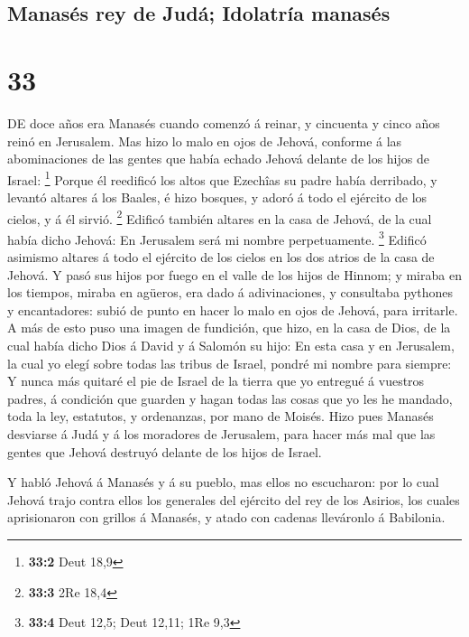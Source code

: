 \hypertarget{manasuxe9s-rey-de-juduxe1-idolatruxeda-manasuxe9s}{%
\subsection{Manasés rey de Judá; Idolatría
manasés}\label{manasuxe9s-rey-de-juduxe1-idolatruxeda-manasuxe9s}}

\hypertarget{section-32}{%
\section{33}\label{section-32}}

 DE doce años era Manasés cuando comenzó á reinar, y
cincuenta y cinco años reinó en Jerusalem.  Mas hizo lo
malo en ojos de Jehová, conforme á las abominaciones de las gentes que
había echado Jehová delante de los hijos de Israel: \footnote{\textbf{33:2}
  Deut 18,9}  Porque él reedificó los altos que Ezechîas
su padre había derribado, y levantó altares á los Baales, é hizo
bosques, y adoró á todo el ejército de los cielos, y á él sirvió.
\footnote{\textbf{33:3} 2Re 18,4}  Edificó también altares
en la casa de Jehová, de la cual había dicho Jehová: En Jerusalem será
mi nombre perpetuamente. \footnote{\textbf{33:4} Deut 12,5; Deut 12,11;
  1Re 9,3}  Edificó asimismo altares á todo el ejército de
los cielos en los dos atrios de la casa de Jehová.  Y pasó
sus hijos por fuego en el valle de los hijos de Hinnom; y miraba en los
tiempos, miraba en agüeros, era dado á adivinaciones, y consultaba
pythones y encantadores: subió de punto en hacer lo malo en ojos de
Jehová, para irritarle.  A más de esto puso una imagen de
fundición, que hizo, en la casa de Dios, de la cual había dicho Dios á
David y á Salomón su hijo: En esta casa y en Jerusalem, la cual yo elegí
sobre todas las tribus de Israel, pondré mi nombre para siempre:
 Y nunca más quitaré el pie de Israel de la tierra que yo
entregué á vuestros padres, á condición que guarden y hagan todas las
cosas que yo les he mandado, toda la ley, estatutos, y ordenanzas, por
mano de Moisés.  Hizo pues Manasés desviarse á Judá y á
los moradores de Jerusalem, para hacer más mal que las gentes que Jehová
destruyó delante de los hijos de Israel.

 Y habló Jehová á Manasés y á su pueblo, mas ellos no
escucharon: por lo cual Jehová trajo contra ellos los generales del
ejército del rey de los Asirios, los cuales aprisionaron con grillos á
Manasés, y atado con cadenas lleváronlo á Babilonia.

